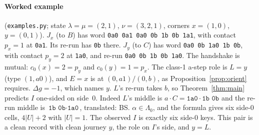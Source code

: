 \documentclass[11pt]{article}
\theoremstyle{definition}\newtheorem{definition}[theorem]{Definition}\newtheorem{remark}[theorem]{Remark}
\begin{document}
\paragraph{Worked example} (\texttt{examples.py}; state $\lambda=\mu=(2,1)$, $\nu=(3,2,1)$, corners $x=(1,0)$, $y=(0,1)$). $J_x$ (to $B$) has word \texttt{0a0 0a1 0a0 0b 1b 0b 1a1}, with contact $p_x=1$ at \texttt{0a1}. Its re-run has \texttt{0b} there. $J_y$ (to $C$) has word \texttt{0a0 0b 1a0 1b 0b}, with contact $p_y=2$ at \texttt{1a0}, and re-run \texttt{0a0 0b 1b 0b 1a0}. The handshake is mutual: $c_0(x)=2=p_y$ and $c_0(y)=1=p_x$. The class-1 a-step role is $L=y$ (type $(1,a0)$), and $E=x$ is at $(0,a1)/(0,b)$, as Proposition~\ref{prop:orient} requires. $\Delta g=-1$, which names $y$. $L$'s re-run takes $b$, so Theorem~\ref{thm:main} predicts $I$ one-sided on side~$0$. Indeed $L$'s middle is $a\cdot C=\texttt{1a0}\cdot\texttt{1b 0b}$ and the re-run middle is $\texttt{1b 0b}\cdot\texttt{1a0}$, translated: BS. $\alpha\in\Lambda_0$, and the formula gives six side-0 cells, $4|U|+2$ with $|U|=1$. The observed $I$ is exactly six side-0 keys. This pair is a clean record with clean journey $y$, the role on $I$'s side, and $y=L$.
\end{document}
